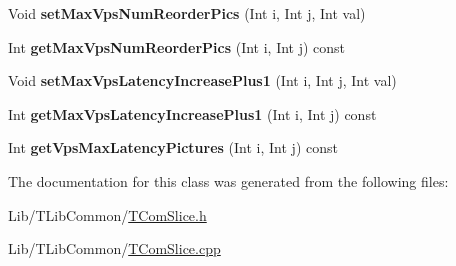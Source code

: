 \begin{DoxyCompactItemize}
Void {\bfseries set\+Max\+Vps\+Num\+Reorder\+Pics} (Int i, Int j, Int val)
\item 
\mbox{\label{class_t_com_dpb_size_ac0a5db1cefda25408401b47fd11edd2e}} 
Int {\bfseries get\+Max\+Vps\+Num\+Reorder\+Pics} (Int i, Int j) const
\item 
\mbox{\label{class_t_com_dpb_size_a31a6c8265629619d91004ecd8cbc26c7}} 
Void {\bfseries set\+Max\+Vps\+Latency\+Increase\+Plus1} (Int i, Int j, Int val)
\item 
\mbox{\label{class_t_com_dpb_size_ab605a9f6551c7555b85fdf8ebdf934c1}} 
Int {\bfseries get\+Max\+Vps\+Latency\+Increase\+Plus1} (Int i, Int j) const
\item 
\mbox{\label{class_t_com_dpb_size_a603169caa89bbbd404589f4aef9898fa}} 
Int {\bfseries get\+Vps\+Max\+Latency\+Pictures} (Int i, Int j) const
\end{DoxyCompactItemize}


The documentation for this class was generated from the following files\+:\begin{DoxyCompactItemize}
\item 
Lib/\+T\+Lib\+Common/\hyperlink{_t_com_slice_8h}{T\+Com\+Slice.\+h}\item 
Lib/\+T\+Lib\+Common/\hyperlink{_t_com_slice_8cpp}{T\+Com\+Slice.\+cpp}\end{DoxyCompactItemize}
